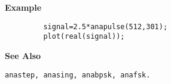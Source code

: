 {\bf \large {}\selectfont Example}
\begin{verbatim}
         signal=2.5*anapulse(512,301);
         plot(real(signal));
\end{verbatim}
\vspace*{.5cm}


{\bf \large {}\selectfont See Also}\\
\hspace*{1.5cm}
\begin{minipage}[t]{13.5cm}
\begin{verbatim}
anastep, anasing, anabpsk, anafsk.
\end{verbatim}
\end{minipage}



